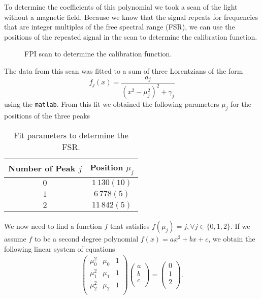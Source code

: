 To determine the coefficients of this polynomial we took a scan of the light without a magnetic field. Because we know that the signal repeats for frequencies that are integer multiples of the free spectral range (FSR), we can use the positions of the repeated signal in the scan to determine the calibration function.
\begin{figure}[H]
	\centering
	\hspace*{-.5cm}
	\caption{FPI scan to determine the calibration function.}
	\label{fig:homogenitaet}
\end{figure}
The data from this scan was fitted to a sum of three Lorentzians of the form
\begin{equation}
	f_j(x)=\frac{a_j}{(x^2-\mu_j^2)^2+\gamma_j}
\end{equation}
using the \texttt{matlab}. From this fit we obtained the following parameters $\mu_j$ for the positions of the three peaks
\begin{table}[H]
	\begin{center}
		\begin{tabular}{cc}
			\toprule
			Number of Peak $j$& Position $\mu_j$\\
			\midrule
			$0$&$1\,130(10)$\\
			$1$&$6\,778(5)$\\
			$2$&$11\,842(5)$\\
			\bottomrule
		\end{tabular}
		\caption{Fit parameters to determine the FSR.}
	\end{center}
\end{table}
We now need to find a function $f$ that satisfies $f(\mu_j)=j, \forall j\in\{0,1,2\}$. If we assume $f$ to be a second degree polynomial $f(x)=ax^2+bx+c$, we obtain the following linear system of equations
\begin{align}
	\begin{pmatrix}
		\mu_0^2 &\mu_0 &1\\
	    \mu_1^2 &\mu_1&1\\
	    \mu_2^2 &\mu_2&1\\
\end{pmatrix}
\begin{pmatrix}
	a\\b\\c\\
\end{pmatrix}
=
\begin{pmatrix}
	0\\1\\2\\
\end{pmatrix}.
\end{align}
